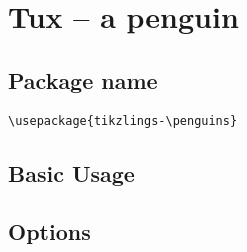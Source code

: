 \documentclass[parskip=half]{scrartcl}
\begin{document}

\clearpage
\section{Tux -- a penguin}

\subsection{Package name}

\begin{tcolorbox}
\vspace*{0.5cm}
\lstinline|\usepackage{tikzlings-\penguins}|
\vspace*{0.5cm}
\end{tcolorbox}

\subsection{Basic Usage}

\begin{tcblisting}{}
\penguin
\end{tcblisting}

\subsection{Options}

\begin{tcblisting}{}
\penguin[body=SteelBlue]
\end{tcblisting}

\begin{tcblisting}{}
\penguin[belly=red]
\end{tcblisting}

\begin{tcblisting}{}
\penguin[feet=red]
\end{tcblisting}

\begin{tcblisting}{}
\penguin[bill=red]
\end{tcblisting}

\begin{tcblisting}{}
\penguin[eye=red]
\end{tcblisting}

\begin{tcblisting}{}
\penguin[pupil=red]
\end{tcblisting}

\begin{tcblisting}{}
\penguin[3D]
\end{tcblisting}
\end{document}

